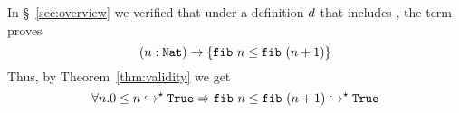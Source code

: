 


%
In \S~\ref{sec:overview} we verified that
under a definition $d$ that includes \fibname,
the term \fibincrname proves
$${{(n:\mathtt{Nat})} \rightarrow {\{\ensuremath{\texttt{fib}\ {n}} \leq \ensuremath{\texttt{fib}\ {(n+1)}}\}}}$$
%
Thus, by Theorem~\ref{thm:validity} we get
%
$$
\forall n. {0 \leq n}\hookrightarrow^{\star}{\mathtt{True}} \Rightarrow {\ensuremath{\texttt{fib}\ {n}} \leq \ensuremath{\texttt{fib}\ {(n+1)}}}\hookrightarrow^{\star}{\mathtt{True}}
$$
